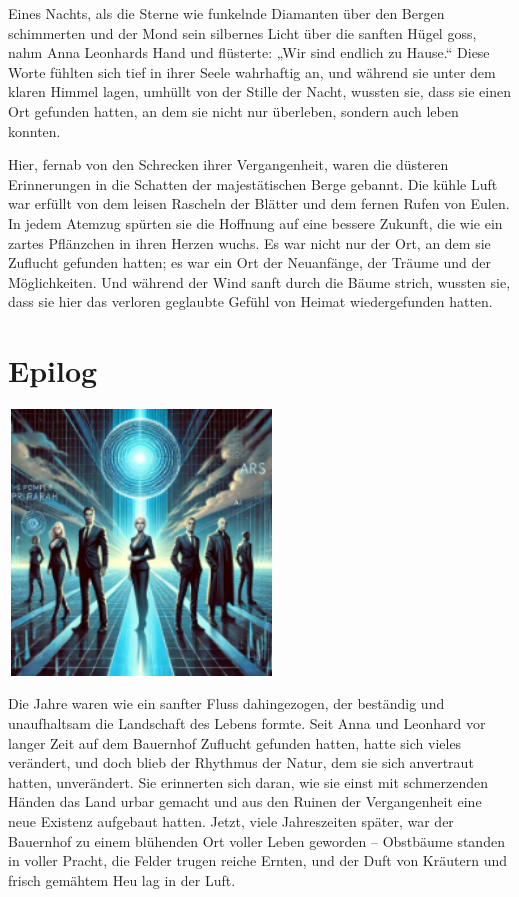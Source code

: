 \documentclass[
]{article}
\begin{document}
Eines Nachts, als die Sterne wie funkelnde Diamanten über den Bergen
schimmerten und der Mond sein silbernes Licht über die sanften Hügel
goss, nahm Anna Leonhards Hand und flüsterte: „Wir sind endlich zu
Hause.`` Diese Worte fühlten sich tief in ihrer Seele wahrhaftig an, und
während sie unter dem klaren Himmel lagen, umhüllt von der Stille der
Nacht, wussten sie, dass sie einen Ort gefunden hatten, an dem sie nicht
nur überleben, sondern auch leben konnten.

Hier, fernab von den Schrecken ihrer Vergangenheit, waren die düsteren
Erinnerungen in die Schatten der majestätischen Berge gebannt. Die kühle
Luft war erfüllt von dem leisen Rascheln der Blätter und dem fernen
Rufen von Eulen. In jedem Atemzug spürten sie die Hoffnung auf eine
bessere Zukunft, die wie ein zartes Pflänzchen in ihren Herzen wuchs. Es
war nicht nur der Ort, an dem sie Zuflucht gefunden hatten; es war ein
Ort der Neuanfänge, der Träume und der Möglichkeiten. Und während der
Wind sanft durch die Bäume strich, wussten sie, dass sie hier das
verloren geglaubte Gefühl von Heimat wiedergefunden hatten.

\section{Epilog}\label{epilog}

\includegraphics[width=2.78439in,height=2.7785in]{media/image0008.png}

Die Jahre waren wie ein sanfter Fluss dahingezogen, der beständig und
unaufhaltsam die Landschaft des Lebens formte. Seit Anna und Leonhard
vor langer Zeit auf dem Bauernhof Zuflucht gefunden hatten, hatte sich
vieles verändert, und doch blieb der Rhythmus der Natur, dem sie sich
anvertraut hatten, unverändert. Sie erinnerten sich daran, wie sie einst
mit schmerzenden Händen das Land urbar gemacht und aus den Ruinen der
Vergangenheit eine neue Existenz aufgebaut hatten. Jetzt, viele
Jahreszeiten später, war der Bauernhof zu einem blühenden Ort voller
Leben geworden -- Obstbäume standen in voller Pracht, die Felder trugen
reiche Ernten, und der Duft von Kräutern und frisch gemähtem Heu lag in
der Luft.
\end{document}
